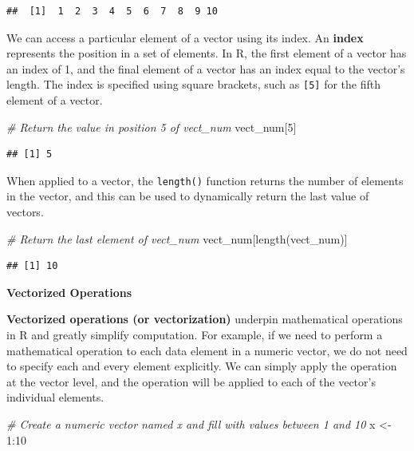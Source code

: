 \documentclass[
]{book}
\newenvironment{Shaded}{\begin{snugshade}}{\end{snugshade}}
\newcommand{\CommentTok}[1]{\textcolor[rgb]{0.56,0.35,0.01}{\textit{#1}}}
\newcommand{\DecValTok}[1]{\textcolor[rgb]{0.00,0.00,0.81}{#1}}
\newcommand{\FunctionTok}[1]{\textcolor[rgb]{0.00,0.00,0.00}{#1}}
\newcommand{\NormalTok}[1]{#1}
\newcommand{\OtherTok}[1]{\textcolor[rgb]{0.56,0.35,0.01}{#1}}
\newcommand{\SpecialCharTok}[1]{\textcolor[rgb]{0.00,0.00,0.00}{#1}}
\begin{document}
\begin{verbatim}
##  [1]  1  2  3  4  5  6  7  8  9 10
\end{verbatim}

We can access a particular element of a vector using its index. An \textbf{index} represents the position in a set of elements. In R, the first element of a vector has an index of 1, and the final element of a vector has an index equal to the vector's length. The index is specified using square brackets, such as \texttt{{[}5{]}} for the fifth element of a vector.

\begin{Shaded}
\begin{Highlighting}[]
\CommentTok{\# Return the value in position 5 of vect\_num}
\NormalTok{vect\_num[}\DecValTok{5}\NormalTok{]}
\end{Highlighting}
\end{Shaded}

\begin{verbatim}
## [1] 5
\end{verbatim}

When applied to a vector, the \texttt{length()} function returns the number of elements in the vector, and this can be used to dynamically return the last value of vectors.

\begin{Shaded}
\begin{Highlighting}[]
\CommentTok{\# Return the last element of vect\_num}
\NormalTok{vect\_num[}\FunctionTok{length}\NormalTok{(vect\_num)]}
\end{Highlighting}
\end{Shaded}

\begin{verbatim}
## [1] 10
\end{verbatim}

\textbf{Vectorized Operations}

\textbf{Vectorized operations (or vectorization)} underpin mathematical operations in R and greatly simplify computation. For example, if we need to perform a mathematical operation to each data element in a numeric vector, we do not need to specify each and every element explicitly. We can simply apply the operation at the vector level, and the operation will be applied to each of the vector's individual elements.

\begin{Shaded}
\begin{Highlighting}[]
\CommentTok{\# Create a numeric vector named x and fill with values between 1 and 10}
\NormalTok{x }\OtherTok{\textless{}{-}} \DecValTok{1}\SpecialCharTok{:}\DecValTok{10}
\end{Highlighting}
\end{Shaded}
\end{document}
